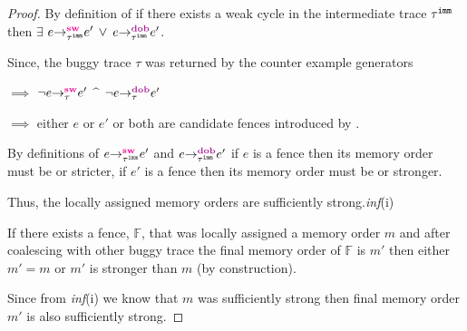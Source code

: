 {
	\label{lem:mo-sound}}
\begin{proof}
	By definition of  if there exists
	a weak cycle in the intermediate trace ${\tau}^{\mathtt{imm}}$ then 
	$\exists$ $\sw{\imm{\tau}}{e}{e'}$ $\vee$ 
	$\dob{\imm{\tau}}{e}{e'}$. 
	
	Since, the buggy trace $\tau$ was returned by the counter
	example generators 
	
	$\implies$ $\neg\sw{\tau}{e}{e'}$ $\^$
	$\neg\dob{\tau}{e}{e'}$
	
	$\implies$ either $e$ or $e'$ or both are candidate fences 
	introduced by \ourtechnique.
	
	By definitions of $\sw{\imm{\tau}}{e}{e'}$ and 
	$\dob{\imm{\tau}}{e}{e'}$
	if $e$ is a fence then its memory order must be \rel or 
	stricter, if $e'$ is a fence then its memory order must be 
	\acq or stronger.
	
	Thus, the locally assigned memory orders are sufficiently 
	strong.\hfill{\it inf}(i)\newline
	
	\noindent
	If there exists a fence, $\mathbb{F}$,  that was locally 
	assigned a memory order $m$ and after coalescing with other 
	buggy trace the final memory order of $\mathbb{F}$ is $m'$
	then either $m' = m$ or $m'$ is stronger than $m$
	(by construction).
	
	\noindent
	Since from {\it inf}(i) we know that $m$ was sufficiently 
	strong then final memory order $m'$ is also sufficiently strong. 
	
\end{proof}

